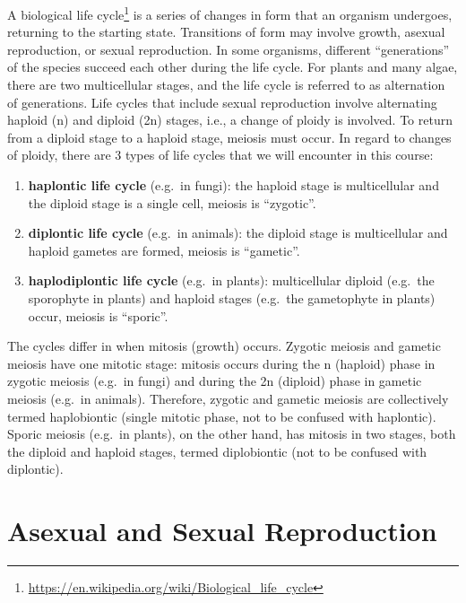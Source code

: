 \documentclass[]{book}
\providecommand{\tightlist}{%
  \setlength{\itemsep}{0pt}\setlength{\parskip}{0pt}}
\let\rmarkdownfootnote\footnote%
\def\footnote{\protect\rmarkdownfootnote}
\renewcommand{\href}[2]{#2\footnote{\url{#1}}}
\begin{document}
A \href{https://en.wikipedia.org/wiki/Biological_life_cycle}{biological life cycle} is a series of changes in form that an organism undergoes, returning to the starting state. Transitions of form may involve growth, asexual reproduction, or sexual reproduction.
In some organisms, different ``generations'' of the species succeed each other during the life cycle. For plants and many algae, there are two multicellular stages, and the life cycle is referred to as alternation of generations.
Life cycles that include sexual reproduction involve alternating haploid (n) and diploid (2n) stages, i.e., a change of ploidy is involved. To return from a diploid stage to a haploid stage, meiosis must occur.
In regard to changes of ploidy, there are 3 types of life cycles that we will encounter in this course:

\begin{enumerate}
\def\labelenumi{\arabic{enumi}.}
\tightlist
\item
  \textbf{haplontic life cycle} (e.g.~in fungi): the haploid stage is multicellular and the diploid stage is a single cell, meiosis is ``zygotic''.
\item
  \textbf{diplontic life cycle} (e.g.~in animals): the diploid stage is multicellular and haploid gametes are formed, meiosis is ``gametic''.
\item
  \textbf{haplodiplontic life cycle} (e.g.~in plants): multicellular diploid (e.g.~the sporophyte in plants) and haploid stages (e.g.~the gametophyte in plants) occur, meiosis is ``sporic''.
\end{enumerate}

The cycles differ in when mitosis (growth) occurs. Zygotic meiosis and gametic meiosis have one mitotic stage: mitosis occurs during the n (haploid) phase in zygotic meiosis (e.g.~in fungi) and during the 2n (diploid) phase in gametic meiosis (e.g.~in animals). Therefore, zygotic and gametic meiosis are collectively termed haplobiontic (single mitotic phase, not to be confused with haplontic). Sporic meiosis (e.g.~in plants), on the other hand, has mitosis in two stages, both the diploid and haploid stages, termed diplobiontic (not to be confused with diplontic).

\hypertarget{asexual-and-sexual-reproduction}{%
\section{Asexual and Sexual Reproduction}\label{asexual-and-sexual-reproduction}}
\end{document}
